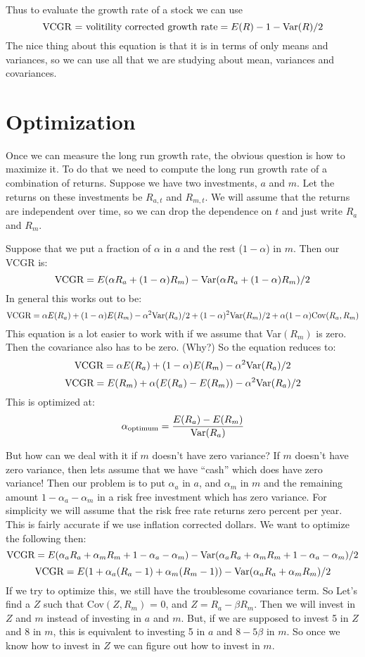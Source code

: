 \documentclass{article}
\begin{document}
Thus to evaluate the growth rate of a stock we can use 
$$\hbox{VCGR = volitility corrected growth rate} = E(R) - 1  - \hbox{Var}(R)/2$$
The nice thing about this equation is that it is in terms of only
means and variances, so we can use all that we are studying about
mean, variances and covariances.

\section*{Optimization}

Once we can measure the long run growth rate, the obvious question is
how to maximize it.  To do that we need to compute the long run growth
rate of a combination of returns.  Suppose we have two investments,
$a$ and $m$.  Let the returns on these investments be $R_{a,t}$ and
$R_{m,t}$.  We will assume that the returns are independent over time,
so we can drop the dependence on $t$ and just write $R_a$ and $R_m$.

Suppose that we put a fraction of $\alpha$ in $a$ and the rest ($1 -
\alpha$) in $m$.  Then our VCGR is:
$$\hbox{VCGR} = E(\alpha R_a + (1 - \alpha)R_m) - \hbox{Var}(\alpha
R_a + (1 - \alpha)R_m)/2$$
In general this works out to be:
$$\hbox{VCGR} = \alpha E(R_a) + (1 - \alpha)E(R_m) - \alpha^2
\hbox{Var}(R_a)/2  + (1 - \alpha)^2\hbox{Var}(R_m)/2 + \alpha(1-\alpha)\hbox{Cov}(R_a,R_m)$$
This equation is a lot easier to work with if we assume that
Var$(R_m)$ is zero.  Then the covariance also has to be zero. (Why?)
So the equation reduces to:
$$\hbox{VCGR} = \alpha E(R_a) + (1 - \alpha)E(R_m) - \alpha^2\hbox{Var}(R_a)/2$$
$$\hbox{VCGR} = E(R_m) + \alpha (E(R_a) - E(R_m)) - \alpha^2\hbox{Var}(R_a)/2$$
This is optimized at:
$$\alpha_{\hbox{\scriptsize optimum}} = \frac{E(R_a) - E(R_m)}{\hbox{Var}(R_a)}$$

But how can we deal with it if $m$ doesn't have zero variance?  If $m$
doesn't have zero variance, then lets assume that we have ``cash''
which does have zero variance!  Then our problem is to put $\alpha_a$
in $a$, and $\alpha_m$ in $m$ and the remaining amount $1 - \alpha_a -
\alpha_m$ in a risk free investment which has zero variance.  For
simplicity we will assume that the risk free rate returns zero percent
per year.  This is fairly accurate if we use inflation corrected
dollars.  We want to optimize the following then:
$$\hbox{VCGR} = E(\alpha_a R_a + \alpha_m R_m + 1 - \alpha_a - \alpha_m) - \hbox{Var}(\alpha_a
R_a + \alpha_mR_m + 1 - \alpha_a - \alpha_m)/2$$
$$\hbox{VCGR} = E(1 + \alpha_a (R_a - 1) + \alpha_m (R_m - 1)) - \hbox{Var}(\alpha_a
R_a + \alpha_m R_m)/2$$
If we try to optimize this, we still have the troublesome covariance
term.  So Let's find a $Z$ such that Cov$(Z,R_m)$ = 0, and $Z = R_a -
\beta R_m$.  Then we will invest in $Z$ and $m$ instead of investing
in $a$ and $m$.  But, if we are supposed to invest 5 in $Z$ and 8 in
$m$, this is equivalent to investing 5 in $a$ and $8 - 5\beta$ in
$m$.  So once we know how to invest in $Z$ we can figure out how to
invest in $m$.
\end{document}
